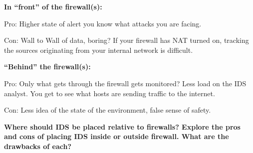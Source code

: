 \documentclass{article}
\begin{document}
{\bf In ``front'' of the firewall(s):}

Pro: Higher state of alert you know what attacks you are facing.

Con: Wall to Wall of data, boring? If your firewall has NAT turned on, tracking
the sources originating from your internal network is difficult.

{\bf ``Behind'' the firewall(s):}

Pro: Only what gets through the firewall gets monitored? Less load on the IDS
analyst. You get to see what hosts are sending traffic to the internet.

Con: Less idea of the state of the environment, false sense of safety.

{\bf Where should IDS be placed relative to firewalls? Explore the pros and cons of
placing IDS inside or outside firewall. What are the drawbacks of each?}
\end{document}
